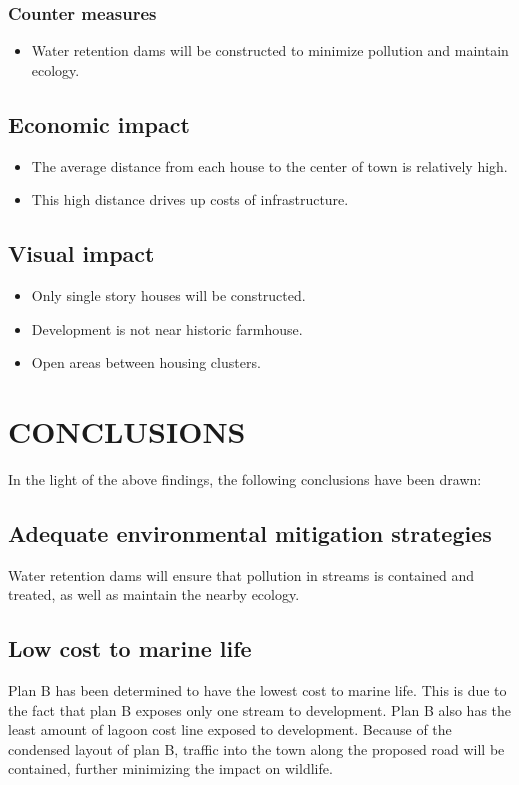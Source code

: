 \documentclass{article}
\begin{document}
\subsubsection{Counter measures}
\begin{itemize}
	\item Water retention dams will be constructed to minimize pollution and maintain ecology.
\end{itemize}

\subsection{Economic impact}
\begin{itemize}
	\item The average distance from each house to the center of town is relatively high.
	\item This high distance drives up costs of infrastructure.
\end{itemize}

\subsection{Visual impact}
\begin{itemize}
	\item Only single story houses will be constructed.
	\item Development is not near historic farmhouse.
	\item Open areas between housing clusters.
\end{itemize}

\newpage
\section{CONCLUSIONS}
In the light of the above findings, the following conclusions have been drawn:

\subsection{Adequate environmental mitigation strategies}
Water retention dams will ensure that pollution in streams is contained and treated, as well as maintain the nearby ecology.

\subsection{Low cost to marine life}
Plan B has been determined to have the lowest cost to marine life. This is due to the fact that plan B exposes only one stream to development. Plan B also has the least amount of lagoon cost line exposed to development. Because of the condensed layout of plan B, traffic into the town along the proposed road will be contained, further minimizing the impact on wildlife.
\end{document}
